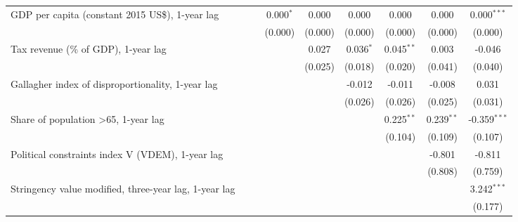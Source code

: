 \begin{table}[htbp]
\begin{tabular}{lcccccccc}
      GDP per capita (constant 2015 US\$), 1-year lag                                  &         &         & 0.000$^{*}$ & 0.000   & 0.000       & 0.000        & 0.000        & 0.000$^{***}$\\   
                                                                                       &         &         & (0.000)     & (0.000) & (0.000)     & (0.000)      & (0.000)      & (0.000)\\   
      Tax revenue (\% of GDP), 1-year lag                                              &         &         &             & 0.027   & 0.036$^{*}$ & 0.045$^{**}$ & 0.003        & -0.046\\   
                                                                                       &         &         &             & (0.025) & (0.018)     & (0.020)      & (0.041)      & (0.040)\\   
      Gallagher index of disproportionality, 1-year lag                                &         &         &             &         & -0.012      & -0.011       & -0.008       & 0.031\\   
                                                                                       &         &         &             &         & (0.026)     & (0.026)      & (0.025)      & (0.031)\\   
      Share of population >65, 1-year lag                                              &         &         &             &         &             & 0.225$^{**}$ & 0.239$^{**}$ & -0.359$^{***}$\\   
                                                                                       &         &         &             &         &             & (0.104)      & (0.109)      & (0.107)\\   
      Political constraints index V (VDEM), 1-year lag                                 &         &         &             &         &             &              & -0.801       & -0.811\\   
                                                                                       &         &         &             &         &             &              & (0.808)      & (0.759)\\   
      Stringency value modified, three-year lag, 1-year lag                            &         &         &             &         &             &              &              & 3.242$^{***}$\\   
                                                                                       &         &         &             &         &             &              &              & (0.177)\\   

\end{tabular}
\end{table}
